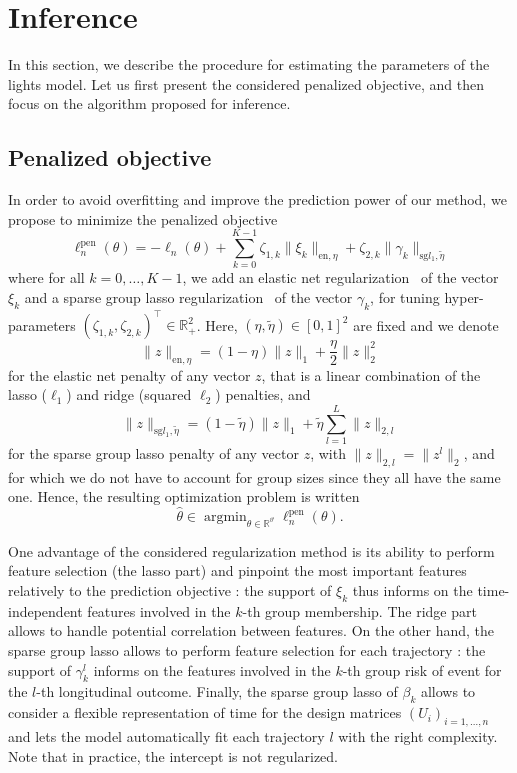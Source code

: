 \documentclass[11pt]{article}
\DeclareMathOperator{\argmin}{argmin}
\newcommand{\norm}[1]{\|#1\|}
\newcommand{\R}{\mathds R}
\begin{document}
\section{Inference}
\label{sec:inference}

In this section, we describe the procedure for estimating the parameters of the lights model. Let us first present the considered penalized objective, and then focus on the algorithm proposed for inference.

\subsection{Penalized objective}
\label{sec:penalized-obj}

In order to avoid overfitting and improve the prediction power of our method, we propose to minimize the penalized objective
\begin{equation}
  \label{eq:pen-log-lik}
	\ell_n^\text{pen}(\theta) = - \ell_n(\theta) + \sum_{k=0}^{K-1} \zeta_{1,k} \norm{\xi_k}_{\text{en}, \eta} + \zeta_{2,k} \norm{\gamma_k}_{\text{sg} l_1, \tilde{\eta}}
\end{equation}
where for all $k=0, \ldots, K-1$, we add an elastic net regularization~\citep{zou2005regularization} of the vector $\xi_k$ and a sparse group lasso regularization~\citep{simon2013sparse} of the vector $\gamma_k$, for tuning hyper-parameters $(\zeta_{1,k}, \zeta_{2,k})^\top \in \R_+^2$. Here, $(\eta, \tilde{\eta}) \in [0, 1]^2$ are fixed and we denote
\[ \norm{z}_{\text{en}, \eta} = (1-\eta)\norm{z}_1 + \dfrac\eta2 \norm{z}_2^2 \]
for the elastic net penalty of any vector $z$, that is a linear combination of the lasso ($\ell_1$) and ridge (squared $\ell_2$) penalties, and
\[ \norm{z}_{\text{sg} l_1, \tilde{\eta}} = (1-\tilde{\eta})\norm{z}_1 + \tilde{\eta} \sum_{l=1}^L\norm{z}_{2,l} \] for the sparse group lasso penalty of any vector $z$, with $\norm{z}_{2,l}=\norm{z^l}_2$, and for which we do not have to account for group sizes since they all have the same one. 
Hence, the resulting optimization problem is written
\begin{equation}
  \label{eq:optim-pb}
   \hat \theta \in \argmin_{\theta \in \R^\vartheta} \ell_n^\text{pen}(\theta).
 \end{equation}

One advantage of the considered regularization method is its ability to perform feature selection (the lasso part) and pinpoint the most important features relatively to the prediction objective : the support of $\xi_k$ thus informs on the time-independent features involved in the $k$-th group membership. The ridge part allows to handle potential correlation between features.
On the other hand, the sparse group lasso allows to perform feature selection for each trajectory : the support of $\gamma_k^l$ informs on the features involved in the $k$-th group risk of event for the $l$-th longitudinal outcome.
Finally, the sparse group lasso of $\beta_k$ allows to consider a flexible representation of time for the design matrices $(U_i)_{i=1, \dots, n}$ and lets the model automatically fit each trajectory $l$ with the right complexity.
Note that in practice, the intercept is not regularized.
\end{document}

